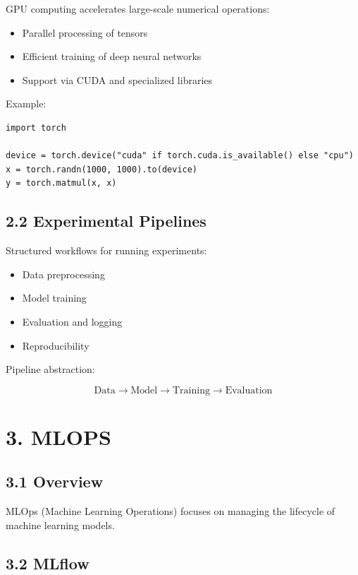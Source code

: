 GPU computing accelerates large-scale numerical operations:

\begin{itemize}
\item Parallel processing of tensors
\item Efficient training of deep neural networks
\item Support via CUDA and specialized libraries
\end{itemize}

Example:

\begin{verbatim}
import torch

device = torch.device("cuda" if torch.cuda.is_available() else "cpu")
x = torch.randn(1000, 1000).to(device)
y = torch.matmul(x, x)
\end{verbatim}

\subsection*{2.2 Experimental Pipelines}

Structured workflows for running experiments:

\begin{itemize}
\item Data preprocessing
\item Model training
\item Evaluation and logging
\item Reproducibility
\end{itemize}

Pipeline abstraction:

\[
\text{Data} \rightarrow \text{Model} \rightarrow \text{Training} \rightarrow \text{Evaluation}
\]

\vspace{0.5cm}

\section*{3. MLOPS}

\subsection*{3.1 Overview}

MLOps (Machine Learning Operations) focuses on managing the lifecycle of machine learning models.

\subsection*{3.2 MLflow}

